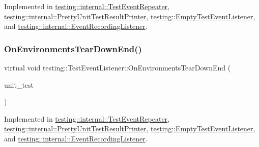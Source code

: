 Implemented in \mbox{\hyperlink{classtesting_1_1internal_1_1TestEventRepeater_ae71819925adec0471fa7abc5072b8244}{testing\+::internal\+::\+Test\+Event\+Repeater}}, \mbox{\hyperlink{classtesting_1_1internal_1_1PrettyUnitTestResultPrinter_a846a5e82b421e04fcdd2b1b2b64b162f}{testing\+::internal\+::\+Pretty\+Unit\+Test\+Result\+Printer}}, \mbox{\hyperlink{classtesting_1_1EmptyTestEventListener_a156d1965248fbdced6aabacadfa2d63f}{testing\+::\+Empty\+Test\+Event\+Listener}}, and \mbox{\hyperlink{classtesting_1_1internal_1_1EventRecordingListener_add61e6e7ebffb8afc90ccabcdc9f9982}{testing\+::internal\+::\+Event\+Recording\+Listener}}.

\mbox{\label{classtesting_1_1TestEventListener_a9ea04fa7f447865ba76df35e12ba2092}} 
\subsubsection{\texorpdfstring{OnEnvironmentsTearDownEnd()}{OnEnvironmentsTearDownEnd()}}
{\footnotesize\ttfamily virtual void testing\+::\+Test\+Event\+Listener\+::\+On\+Environments\+Tear\+Down\+End (\begin{DoxyParamCaption}\item[{const \mbox{\hyperlink{classtesting_1_1UnitTest}{Unit\+Test}} \&}]{unit\+\_\+test }\end{DoxyParamCaption})\hspace{0.3cm}{\ttfamily [pure virtual]}}



Implemented in \mbox{\hyperlink{classtesting_1_1internal_1_1TestEventRepeater_a8428220c4cf9f0cea2dfd9a70f07ab7f}{testing\+::internal\+::\+Test\+Event\+Repeater}}, \mbox{\hyperlink{classtesting_1_1internal_1_1PrettyUnitTestResultPrinter_ab23094ef3b714778b2f742d39818c280}{testing\+::internal\+::\+Pretty\+Unit\+Test\+Result\+Printer}}, \mbox{\hyperlink{classtesting_1_1EmptyTestEventListener_aea64c83c415b33a4c0b0239bafd1438d}{testing\+::\+Empty\+Test\+Event\+Listener}}, and \mbox{\hyperlink{classtesting_1_1internal_1_1EventRecordingListener_acd5a3dc070265166a7da68222031fd61}{testing\+::internal\+::\+Event\+Recording\+Listener}}.

\mbox{\label{classtesting_1_1TestEventListener_a468b5e6701bcb86cb2c956caadbba5e4}} 
